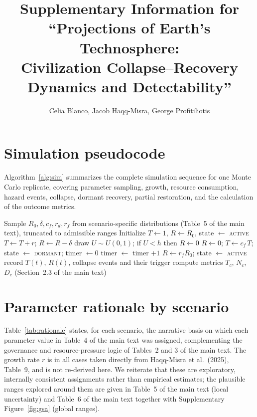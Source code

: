 \documentclass[11pt]{article}
\title{Supplementary Information for \\ ``Projections of Earth's Technosphere: \\ Civilization Collapse--Recovery Dynamics and Detectability''}
\author{Celia Blanco, Jacob Haqq-Misra, George Profitiliotis}
\date{}
\begin{document}
\maketitle

\section{Simulation pseudocode}\label{app:pseudocode}

Algorithm~\ref{alg:sim} summarizes the complete simulation sequence for one Monte Carlo replicate, covering parameter sampling, growth, resource consumption, hazard events, collapse, dormant recovery, partial restoration, and the calculation of the outcome metrics.

\begin{algorithm}[htbp]
\caption{Collapse-recovery simulation for one Monte Carlo replicate}
\label{alg:sim}
\begin{algorithmic}[1]
\State Sample $R_0, \delta, c_f, r_d, r_f$ from scenario-specific distributions (Table~5 of the main text), truncated to admissible ranges
\State Initialize $T \gets 1$, $R \gets R_0$, state $\gets$ \textsc{active}
        \State $T \gets T + r$; \quad $R \gets R - \delta$ 
        \State draw $U \sim U(0,1)$; if $U < h$ then $R \gets 0$ 
         
            \State $R \gets 0$; \quad $T \gets c_f\, T$; \quad state $\gets$ \textsc{dormant}; \quad timer $\gets 0$
        \EndIf
    \Else {}
        \State timer $\gets$ timer $+ 1$
            \State $R \gets r_f R_0$; \quad state $\gets$ \textsc{active} 
        \EndIf
    \EndIf
    \State record $T(t)$, $R(t)$, collapse events and their trigger
\EndFor
\State compute metrics $T_c$, $N_c$, $D_c$ (Section~2.3 of the main text)
\end{algorithmic}
\end{algorithm}

\FloatBarrier

\section{Parameter rationale by scenario}\label{app:rationale}

Table~\ref{tab:rationale} states, for each scenario, the narrative basis on which each parameter value in Table~4 of the main text was assigned, complementing the governance and resource-pressure logic of Tables~2 and 3 of the main text. The growth rate $r$ is in all cases taken directly from Haqq-Misra et al.\ (2025), Table~9, and is not re-derived here. We reiterate that these are exploratory, internally consistent assignments rather than empirical estimates; the plausible ranges explored around them are given in Table~5 of the main text (local uncertainty) and Table~6 of the main text together with Supplementary Figure~\ref{fig:gsa} (global ranges).
\end{document}
